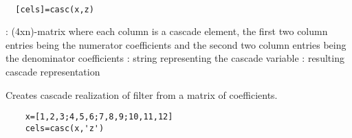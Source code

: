 
\begin{mandesc}
   \\ %
\end{mandesc}
\begin{calling_sequence}
\begin{verbatim}
  [cels]=casc(x,z)  
\end{verbatim}
\end{calling_sequence}
\begin{parameters}
  \begin{varlist}
    : (4xn)-matrix where each column is a cascade element, the first two column entries being the numerator coefficients and the second two column entries being the denominator coefficients
    : string representing the cascade variable
    : resulting cascade representation
  \end{varlist}
\end{parameters}
\begin{mandescription}
  Creates cascade realization of filter from a matrix of coefficients.
\end{mandescription}
\begin{examples}
  \begin{Verbatim}
    x=[1,2,3;4,5,6;7,8,9;10,11,12]
    cels=casc(x,'z')
  \end{Verbatim}
\end{examples}
